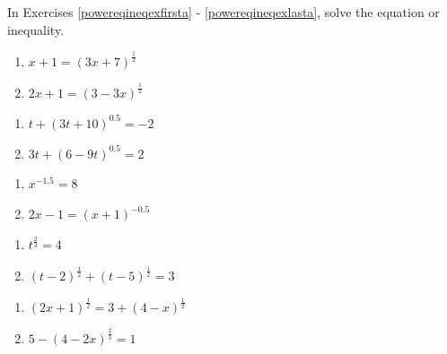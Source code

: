In Exercises \ref{powereqineqexfirsta} - \ref{powereqineqexlasta}, solve the equation or inequality.  


\begin{multicols}{2}
\begin{enumerate}


\item $x+1 = (3x+7)^{\frac{1}{2}}$ \label{powereqineqexfirsta}
\item  $2x+1 = (3-3x)^{\frac{1}{2}}$

\setcounter{HW}{\value{enumi}}
\end{enumerate}
\end{multicols}

\begin{multicols}{2}
\begin{enumerate}
\setcounter{enumi}{\value{HW}}


\item  $t + (3t+10)^{0.5} = -2$
\item  $3t+(6-9t)^{0.5}=2$

\setcounter{HW}{\value{enumi}}
\end{enumerate}
\end{multicols}

\begin{multicols}{2}
\begin{enumerate}
\setcounter{enumi}{\value{HW}}

\item $x^{-1.5} = 8$
\item $2x - 1 =  (x + 1)^{-0.5}$

\setcounter{HW}{\value{enumi}}
\end{enumerate}
\end{multicols}

\begin{multicols}{2}
\begin{enumerate}
\setcounter{enumi}{\value{HW}}

\item $t^{\frac{2}{3}} = 4$
\item $(t - 2)^{\frac{1}{2}} + (t - 5)^{\frac{1}{2}} = 3$

\setcounter{HW}{\value{enumi}}
\end{enumerate}
\end{multicols}

\begin{multicols}{2}
\begin{enumerate}
\setcounter{enumi}{\value{HW}}

\item $(2x+1)^{\frac{1}{2}} = 3 + (4-x)^{\frac{1}{2}}$
\item  $5 - (4-2x)^{\frac{2}{3}} = 1$

\setcounter{HW}{\value{enumi}}
\end{enumerate}
\end{multicols}

